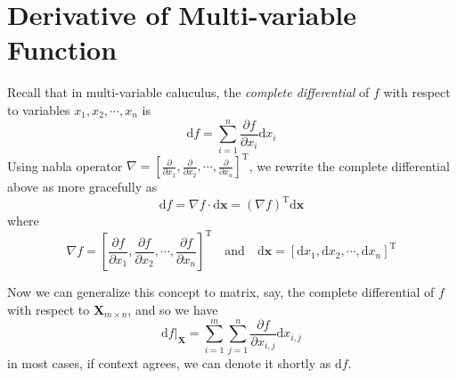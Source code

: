 \documentclass{article}
\newcommand{\Transpose}{\ensuremath{\mathrm{T}}}
\newcommand{\Differential}{\ensuremath{\mathrm{d}}}
\newcommand{\MatrixSymbol}[1]{\ensuremath{{\boldsymbol{#1}}}}
\newcommand{\MatrixX}{\MatrixSymbol{X}}
\theoremstyle{nonumberplain}
\begin{document}
\section{Derivative of Multi-variable Function}
Recall that in multi-variable caluculus, the \textit{complete differential} of $f$ with respect to variables $x_1,x_2,\cdots,x_n$ is 
\begin{equation*}
    \Differential f=\sum_{i=1}^n \frac{\partial f}{\partial x_i}\Differential x_i
\end{equation*}
Using nabla operator $\nabla=[\frac{\partial}{\partial x_1},\frac{\partial}{\partial x_2},\cdots,\frac{\partial}{\partial x_n}]^\Transpose$, we rewrite the complete differential above as more gracefully as
\begin{equation}
    \Differential f=\nabla f \cdot \Differential \MatrixSymbol{x}=(\nabla f)^\Transpose\Differential \MatrixSymbol{x}
\end{equation}
where
\begin{equation*}
    \nabla f=[\frac{\partial f}{\partial x_1},\frac{\partial f}{\partial x_2},\cdots,\frac{\partial f}{\partial x_n}]^\Transpose
    \quad \text{and} \quad 
    \Differential\MatrixSymbol{x}=[\Differential x_1,\Differential x_2,\cdots,\Differential x_n]^\Transpose
\end{equation*} 

Now we can generalize this concept to matrix, say, the complete differential of $f$ with respect to $\MatrixX_{m\times n}$, and so we have
\begin{equation}
    \Differential f\big|_\MatrixX=\sum_{i=1}^m\sum_{j=1}^n \frac{\partial f}{\partial x_{i,j}}\Differential x_{i,j}
\end{equation}
in most cases, if context agrees, we can denote it shortly as $\Differential f$.
\end{document}
